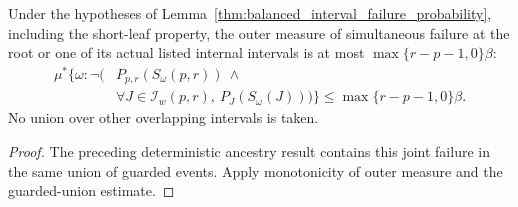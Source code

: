 \begin{lemma}
    \label{lem:independent_interval_joint_failure_probability}
    \leanok
    Under the hypotheses of
    Lemma~\ref{thm:balanced_interval_failure_probability}, including
    the short-leaf property, the outer measure of simultaneous failure
    at the root or one of its actual listed internal intervals is at most
    $\max\{r-p-1,0\}\beta$:
    \begin{align*}
        \mu^*\bigl\{\omega:\neg\bigl( & P_{p,r}(S_\omega(p,r))\ \land                                 \\
                                      & \forall J\in\mathcal I_w(p,r),\ P_J(S_\omega(J))\bigr)\bigr\}
        \le\max\{r-p-1,0\}\beta.
    \end{align*}
    No union over other overlapping intervals is taken.
\end{lemma}
\begin{proof}\leanok
    The preceding deterministic ancestry result contains this joint
    failure in the same union of guarded events. Apply monotonicity
    of outer measure and the guarded-union estimate.
\end{proof}

